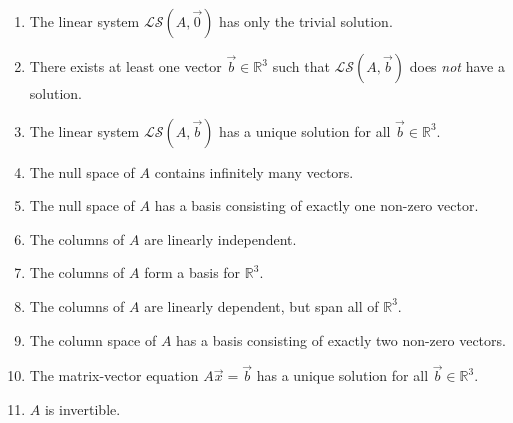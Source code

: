 \documentclass[11pt]{article}
\theoremstyle{definition}
\begin{document}
\begin{enumerate}
\begin{enumerate}
\item The linear system $\mathcal{LS}(A,\vec{0})$ has only the trivial solution.
\item There exists at least one vector $\vec{b} \in \mathbb{R}^3$ such that $\mathcal{LS}(A,\vec{b})$ does \emph{not} have a solution.
\item The linear system $\mathcal{LS}(A,\vec{b})$ has a unique solution for all $\vec{b}\in\mathbb{R}^{3}$.
\item The null space of $A$ contains infinitely many vectors.
\item The null space of $A$ has a basis consisting of exactly one non-zero vector.
\item The columns of $A$ are linearly independent.
\item The columns of $A$ form a basis for $\mathbb{R}^3$.
\item The columns of $A$ are linearly dependent, but span all of $\mathbb{R}^3$.
\item The column space of $A$ has a basis consisting of exactly two non-zero vectors.
\item The matrix-vector equation $A\vec{x}=\vec{b}$ has a unique solution for all $\vec{b}\in\mathbb{R}^3$.
\item $A$ is invertible.


\end{enumerate}
\end{enumerate}
\end{document}
